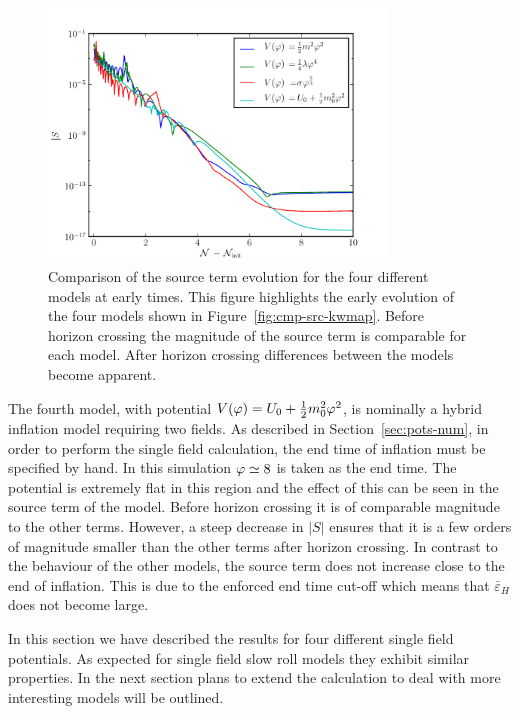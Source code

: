 \begin{figure}[htbp]
 \centering
 \includegraphics[width=0.8\textwidth]{numerical/graphs/cmp_src_kwmap_zoom-large}
 \caption[Comparison of source term for models at early stage]{Comparison of the
source term evolution for the four different models at early times. This figure
highlights the early evolution of the four models shown in
Figure~\ref{fig:cmp-src-kwmap}. Before horizon crossing the magnitude of the source
term is comparable for each model. After horizon crossing differences between the
models become apparent.}
\label{fig:cmp-src-zoom-kwmap}
\end{figure}
% 

The fourth model, with potential $V(\varphi)=U_0 + \frac{1}{2} m_0^2 \varphi^2$, is nominally a hybrid
inflation model
requiring two fields.
As described in Section~\ref{sec:pots-num}, in order to perform the single field
calculation, the end time of inflation must be specified by hand. In this simulation
$\varphi\simeq 8$
is taken as the end time. The potential is extremely flat in this region and the
effect of this can
be seen in the source term of the model. Before horizon crossing it is of comparable magnitude to
the other terms. However, a steep decrease in $|S|$ ensures that it is a few orders
of magnitude
smaller than
the other terms after horizon crossing. In contrast to the behaviour of the other models, the source
term does not increase close to the end of inflation. This is due to the enforced end time cut-off
which means that $\bar{\varepsilon}_H$ does not become large.

In this section we have described the results for four different single field potentials. As
expected for single field slow roll models they exhibit similar properties. In the next section
plans to extend the calculation to deal with more interesting models will be outlined.

